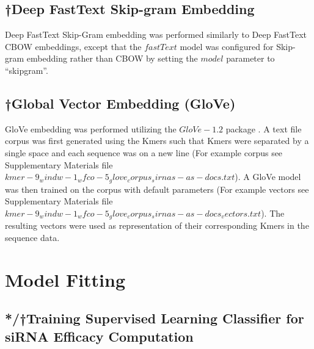 \documentclass{report}
\begin{document}
\subsection{†Deep FastText Skip-gram Embedding}\label{met:fasttext skip-gram}

Deep FastText Skip-Gram embedding was performed similarly to Deep FastText CBOW embeddings, except that the $fastText$ model was configured for Skip-gram embedding rather than CBOW by setting the $model$ parameter to “skipgram”. 


\subsection{†Global Vector Embedding (GloVe)}\label{met:glove}

GloVe embedding was performed utilizing the $GloVe-1.2$ package \cite{pennington_glove_2014}. A text file corpus was first generated using the Kmers such that Kmers were separated by a single space and each sequence was on a new line (For example corpus see Supplementary Materials file $kmer-9_windw-1_wfco-5_glove_corpus_sirnas-as-docs.txt$). A GloVe model was then trained on the corpus with default parameters (For example vectors see Supplementary Materials file $kmer-9_windw-1_wfco-5_glove_corpus_sirnas-as-docs_vectors.txt$). The resulting vectors were used as representation of their corresponding Kmers in the sequence data.


\section{Model Fitting}\label{met:model fitting}
\subsection{*/†Training Supervised Learning Classifier for siRNA Efficacy Computation}
\end{document}
